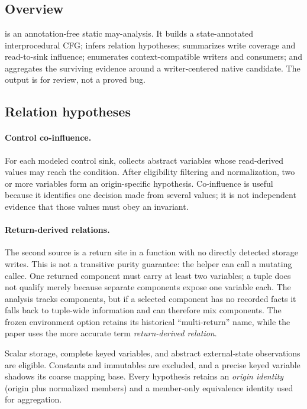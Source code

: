\section{\sys}
\label{s:mvscan}

\subsection{Overview}

\sys is an annotation-free static may-analysis. It builds a state-annotated interprocedural CFG; infers relation hypotheses; summarizes write coverage and read-to-sink influence; enumerates context-compatible writers and consumers; and aggregates the surviving evidence around a writer-centered native candidate. The output is for review, not a proved bug.

\subsection{Relation hypotheses}
\label{s:relation-discovery}

\paragraph{Control co-influence.}
For each modeled control sink, \sys collects abstract variables whose read-derived values may reach the condition. After eligibility filtering and normalization, two or more variables form an origin-specific hypothesis. Co-influence is useful because it identifies one decision made from several values; it is not independent evidence that those values must obey an invariant.

\paragraph{Return-derived relations.}
The second source is a return site in a function with no directly detected storage writes. This is not a transitive purity guarantee: the helper can call a mutating callee. One returned component must carry at least two variables; a tuple does not qualify merely because separate components expose one variable each. The analysis tracks components, but if a selected component has no recorded facts it falls back to tuple-wide information and can therefore mix components. The frozen environment option retains its historical ``multi-return'' name, while the paper uses the more accurate term \emph{return-derived relation}.

Scalar storage, complete keyed variables, and abstract external-state observations are eligible. Constants and immutables are excluded, and a precise keyed variable shadows its coarse mapping base. Every hypothesis retains an \emph{origin identity} (origin plus normalized members) and a member-only equivalence identity used for aggregation.

